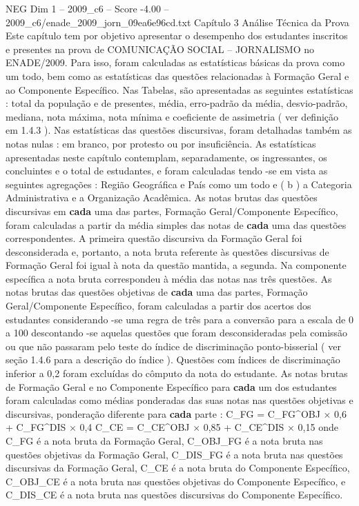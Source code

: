 \begin{textsample}{NEG Dim 1 – 2009\_c6 – Score -4.00 – 2009\_c6/enade\_2009\_jorn\_09ea6e96cd.txt}  \label{ex:f1_neg_212}
Capítulo 3 Análise Técnica da Prova Este capítulo tem por objetivo apresentar o desempenho dos estudantes inscritos e presentes na prova de COMUNICAÇÃO SOCIAL – JORNALISMO no ENADE/2009.
Para isso, foram calculadas as estatísticas básicas da prova como um todo, bem como as estatísticas das questões relacionadas à Formação Geral e ao Componente Específico.
Nas Tabelas, são apresentadas as seguintes estatísticas : total da população e de presentes, média, erro-padrão da média, desvio-padrão, mediana, nota máxima, nota mínima e coeficiente de assimetria ( ver definição em 1.4.3 ).
Nas estatísticas das questões discursivas, foram detalhadas também as notas nulas : em branco, por protesto ou por insuficiência.
As estatísticas apresentadas neste capítulo contemplam, separadamente, os ingressantes, os concluintes e o total de estudantes, e foram calculadas tendo -se em vista as seguintes agregações : Região Geográfica e País como um todo e ( b ) a Categoria Administrativa e a Organização Acadêmica.
As notas brutas das questões discursivas em \textbf{cada} uma das partes, Formação Geral/Componente Específico, foram calculadas a partir da média simples das notas de \textbf{cada} uma das questões correspondentes.
A primeira questão discursiva da Formação Geral foi desconsiderada e, portanto, a nota bruta referente às questões discursivas de Formação Geral foi igual à nota da questão mantida, a segunda.
Na componente específica a nota bruta correspondeu à média das notas nas três questões.
As notas brutas das questões objetivas de \textbf{cada} uma das partes, Formação Geral/Componente Específico, foram calculadas a partir dos acertos dos estudantes considerando -se uma regra de três para a conversão para a escala de 0 a 100 descontando -se aquelas questões que foram desconsideradas pela comissão ou que não passaram pelo teste do índice de discriminação ponto-bisserial ( ver seção 1.4.6 para a descrição do índice ).
Questões com índices de discriminação inferior a 0,2 foram excluídas do cômputo da nota do estudante.
As notas brutas de Formação Geral e no Componente Específico para \textbf{cada} um dos estudantes foram calculadas como médias ponderadas das suas notas nas questões objetivas e discursivas, ponderação diferente para \textbf{cada} parte : C\_FG = C\_FG\textasciicircum{}OBJ × 0,6 + C\_FG\textasciicircum{}DIS × 0,4 C\_CE = C\_CE\textasciicircum{}OBJ × 0,85 + C\_CE\textasciicircum{}DIS × 0,15 onde C\_FG é a nota bruta da Formação Geral, C\_OBJ\_FG é a nota bruta nas questões objetivas da Formação Geral, C\_DIS\_FG é a nota bruta nas questões discursivas da Formação Geral, C\_CE é a nota bruta do Componente Específico, C\_OBJ\_CE é a nota bruta nas questões objetivas do Componente Específico, e C\_DIS\_CE é a nota bruta nas questões discursivas do Componente Específico.

\end{textsample}
